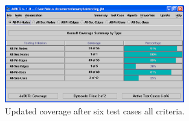 \begin{figure}[!ht]
\begin{center}
\includegraphics[width=0.70\textwidth]{fig/report-by-criterion-tc6}
\caption{\label{fig:summary-criterion-tc6} Updated coverage after
six test cases \wrt all criteria.}
\end{center}
\end{figure}
